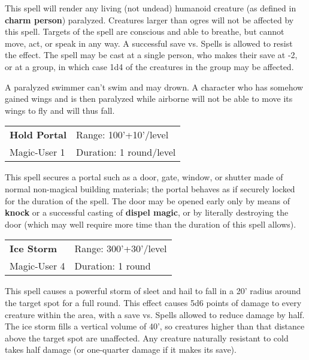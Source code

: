 \documentclass[a4paper,twoside,openany,10pt]{book}
\begin{document}
\begin{multicols}{2}
This spell will render any living (not undead) humanoid creature (as defined in \textbf{charm person}) paralyzed. Creatures larger than ogres will not be affected by this spell. Targets of the spell are conscious and able to breathe, but cannot move, act, or speak in any way. A successful save vs. Spells is allowed to resist the effect. The spell may be cast at a single person, who makes their save at -2, or at a group, in which case 1d4 of the creatures in the group may be affected.

A paralyzed swimmer can't swim and may drown. A character who has somehow gained wings and is then paralyzed while airborne will not be able to move its wings to fly and will thus fall.


\smallskip\begin{flushleft} 
	\begin{tabularx}{0.45\textwidth}{@{}m{3.5cm}m{5.5cm}@{}} 
		\textbf{Hold Portal} & Range: 100'+10'/level\\
Magic-User 1 & Duration: 1 round/level\\
	\end{tabularx}\end{flushleft}

This spell secures a portal such as a door, gate, window, or shutter made of normal non-magical building materials; the portal behaves as if securely locked for the duration of the spell. The door may be opened early only by means of \textbf{knock} or a successful casting of \textbf{dispel magic}, or by literally destroying the door (which may well require more time than the duration of this spell allows).



\smallskip\begin{flushleft} 
	\begin{tabularx}{0.45\textwidth}{@{}m{3.5cm}m{5.5cm}@{}} 
		\textbf{Ice Storm} & Range: 300'+30'/level\\
		Magic-User 4 & Duration: 1 round\\
	\end{tabularx}\end{flushleft}

This spell causes a powerful storm of sleet and hail to fall in a 20' radius around the target spot for a full round. This effect causes 5d6 points of damage to every creature within the area, with a save vs. Spells allowed to reduce damage by half. The ice storm fills a vertical volume of 40', so creatures higher than that distance above the target spot are unaffected. Any creature naturally resistant to cold takes half damage (or one-quarter damage if it makes its save).


\end{multicols}
\end{document}
